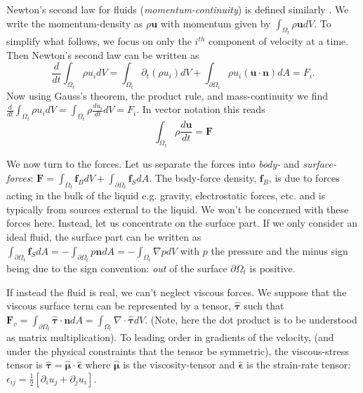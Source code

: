 \documentclass[rmp,aps,nofootinbib,superscriptaddress,floatfix]{revtex4-2}
\begin{document}
Newton's second law for fluids (\emph{momentum-continuity}) is defined similarly \cite{schoeffel2014lecture,mcdonough2009lectures}. We write the momentum-density as $\rho \bm{u}$ with momentum given by $\int_{\Omega_t} \rho \bm{u} dV$. To simplify what follows, we focus on only the $i^{th}$ component of velocity at a time. Then Newton's second law can be written as 
\begin{equation}
    \frac{d}{dt} \int_{\Omega_t} \rho u_i dV =  \int_{\Omega_t} \partial_t (\rho u_i) dV+\int_{\partial \Omega_t} \rho u_i ( \bm{u} \cdot \bm{n}) dA = F_i.
\end{equation}
Now using Gauss's theorem, the product rule, and mass-continuity we find $ \frac{d}{dt} \int_{\Omega_t} \rho u_i dV =  \int_{\Omega_t} \rho \frac{d u_i}{dt} dV = F_i $. In vector notation this reads
\begin{equation}
    \int_{\Omega_t} \rho \frac{d \bm{u}}{dt} = \bm{F}
    \label{eq:mom_continuity}
\end{equation}

We now turn to the forces. Let us separate the forces into \emph{body-} and \emph{surface-forces}: $\bm{F}=\int_{\Omega_t} \bm{f}_B dV+ \int_{\partial \Omega_t} \bm{f}_S dA $. The body-force density, $\bm{f}_B$, is due to forces acting in the bulk of the liquid e.g. gravity, electrostatic forces, etc. and is typically from sources external to the liquid. We won't be concerned with these forces here. Instead, let us concentrate on the surface part. If we only consider an ideal fluid, the surface part can be written as $\int_{\partial \Omega_t} \bm{f}_S dA =-\int_{\partial \Omega_t} p \bm{n} dA = -\int_{\Omega_t}\nabla p dV$ with $p$ the pressure  and the minus sign being due to the sign convention: \emph{out} of the surface $\partial \Omega_t$ is positive. 

If instead the fluid is real, we can't neglect viscous forces. We suppose that the viscous surface term can be represented by a tensor, $\hat{\bm{\tau}}$ such that $\bm{F}_v=\int_{\partial \Omega_t} \hat{\bm{\tau}}\cdot \bm{n} dA = \int_{\Omega_t} \nabla \cdot \hat{\bm{\tau}} dV$. (Note, here the dot product is to be understood as matrix multiplication). To leading order in gradients of the velocity, (and under the physical constraints that the tensor be symmetric), the viscous-stress tensor is $\hat{\bm{\tau}}=\hat{\bm{\mu}}\cdot \hat{\bm{\epsilon}}$ where $\hat{\bm{\mu}}$ is the viscosity-tensor and $\hat{\bm{\epsilon}}$ is the strain-rate tensor: $\epsilon_{ij}=\frac{1}{2}\left[ \partial_i u_j+ \partial_j u_i \right]$. 
\end{document}
